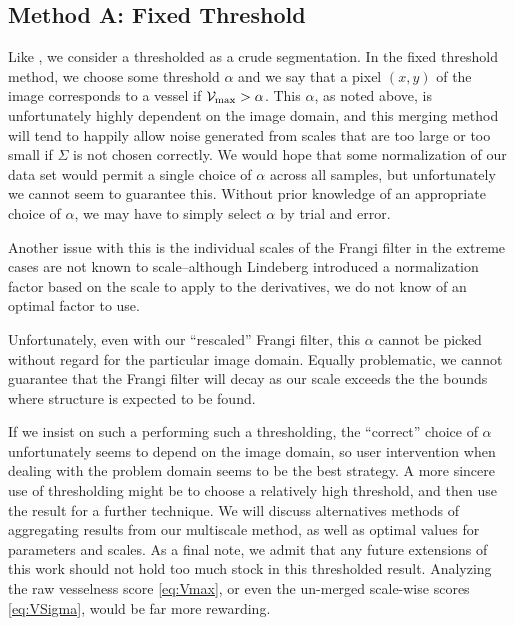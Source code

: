 \subsection{Method A: Fixed Threshold}
Like \textcite{huynh2013filter}, we consider a thresholded \Vmax{} as a crude segmentation.
In the fixed threshold method, we choose some threshold $\alpha$ and we say that a pixel $(x,y)$ of the image corresponds to a vessel if
$\mathcal{V}_{\max} >  \alpha$. This $\alpha$, as noted above, is unfortunately highly dependent on the image domain, and this merging method will tend to happily allow noise generated from scales that are too large or too small if $\Sigma$ is not chosen correctly. We would hope that some normalization of our data set would permit a single choice of $\alpha$ across all samples, but unfortunately we cannot seem to guarantee this. Without prior knowledge of an appropriate choice of $\alpha$, we may have to simply select $\alpha$ by trial and error.

 Another issue with this is the individual scales of the Frangi filter in the extreme cases are not known to scale--although Lindeberg introduced a normalization factor based on the scale to apply to the derivatives, we do not know of an optimal factor to use.

Unfortunately, even with our ``rescaled'' Frangi filter, this $\alpha$ cannot be picked without regard for the particular image domain. Equally problematic, we cannot guarantee that the Frangi filter will decay as our scale exceeds the the bounds where structure is expected to be found.



If we insist on such a performing such a thresholding, the ``correct'' choice of $\alpha$ unfortunately seems to depend on the image domain, so user intervention when dealing with the problem domain seems to be the best strategy. A more sincere use of thresholding might be to choose a relatively high threshold, and then use the result for a further technique.
We will discuss alternatives methods of aggregating results from our multiscale method, as well as optimal values for parameters and scales. As a final note, we admit that any future extensions of this work should not hold too much stock in this thresholded result. Analyzing the raw vesselness score \cref{eq:Vmax}, or even the un-merged scale-wise scores \cref{eq:VSigma}, would be far more rewarding.
 
